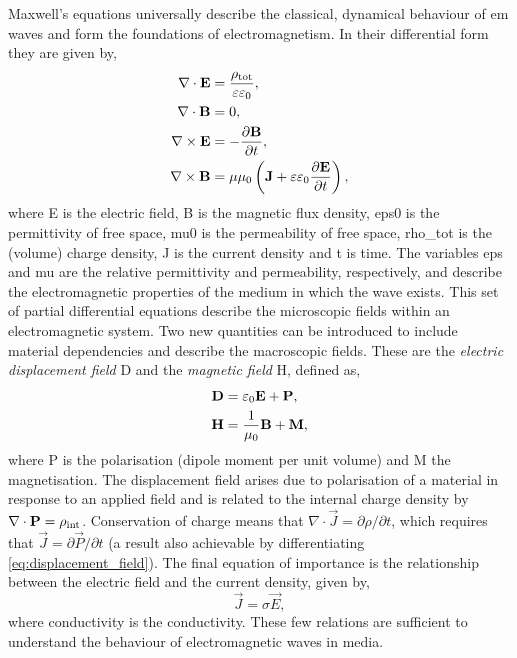 \documentclass{article}
\begin{document}
Maxwell's equations universally describe the classical, dynamical behaviour of \gls{em} waves and form the foundations of electromagnetism. In their differential form they are given by,
\begin{subequations}
\begin{align}
	\nabla \cdot \mathbf{E} &= \frac{\rho_{\mathrm{tot}}}{\varepsilon\varepsilon_0}, \label{eq:maxwell1}\\
	\nabla \cdot \mathbf{B} &= 0, \label{eq:maxwell2}\\
	\nabla \times \mathbf{E} &= -\frac{\partial \mathbf{B}}{\partial t}, \label{eq:maxwell3}\\
	\nabla \times \mathbf{B} &= \mu\mu_0 \left( \mathbf{J} + \varepsilon\varepsilon_0 \frac{\partial \mathbf{E}}{\partial t} \right), \label{eq:maxwell4}
\end{align}
\end{subequations}
where \gls{E} is the electric field, \gls{B} is the magnetic flux density, \gls{eps0} is the permittivity of free space, \gls{mu0} is the permeability of free space, \gls{rho_tot} is the (volume) charge density, \gls{J} is the current density and \gls{t} is time. The variables \gls{eps} and \gls{mu} are the relative permittivity and permeability, respectively, and describe the electromagnetic properties of the medium in which the wave exists. This set of partial differential equations describe the microscopic fields within an electromagnetic system.
Two new quantities can be introduced to include material dependencies and describe the macroscopic fields. These are the \textit{electric displacement field} \gls{D} and the \textit{magnetic field} \gls{H}, defined as,
\begin{subequations}
\begin{align}
	\mathbf{D} &= \varepsilon_0\mathbf{E} + \mathbf{P}, \label{eq:displacement_field}\\
	\mathbf{H} &= \frac{1}{\mu_0}\mathbf{B} + \mathbf{M}, \label{eq:magnetic_field}
\end{align}
\end{subequations}
where \gls{P} is the polarisation (dipole moment per unit volume) and \gls{M} the magnetisation. The displacement field arises due to polarisation of a material in response to an applied field and is related to the internal charge density by $\nabla\cdot\mathbf{P}=\rho_{\mathrm{int}}$. Conservation of charge means that $\nabla\cdot\vec{J}=\partial\rho/\partial t$, which requires that $\vec{J}=\partial\vec{P}/\partial t$ (a result also achievable by differentiating \eqref{eq:displacement_field}). The final equation of importance is the relationship between the electric field and the current density, given by,
\begin{equation}
	\vec{J} = \sigma\vec{E},
	\label{eq:current_density}
\end{equation}
where \gls{conductivity} is the conductivity. These few relations are sufficient to understand the behaviour of electromagnetic waves in media.
\end{document}
